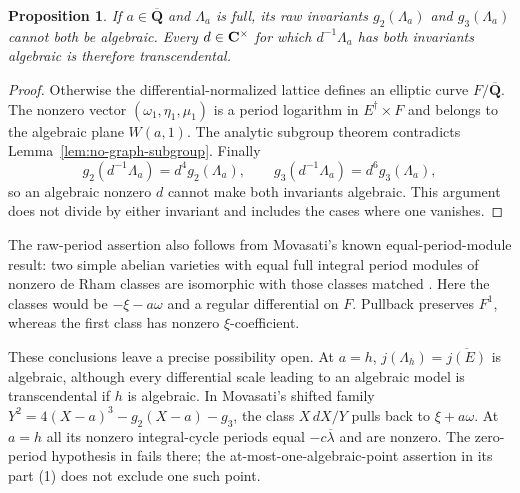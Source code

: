 \documentclass[11pt]{article}
\newtheorem{proposition}[theorem]{Proposition}
\theoremstyle{definition}\newtheorem{definition}[theorem]{Definition}
\theoremstyle{remark}\newtheorem{remark}[theorem]{Remark}
\newcommand{\Qb}{\overline{\mathbf Q}}\newcommand{\Fp}{\mathbf F_p}
\begin{document}
\begin{proposition}\label{prop:raw-second-kind}
If $a\in\Qb$ and $\Lambda_a$ is full, its raw invariants $g_2(\Lambda_a)$ and $g_3(\Lambda_a)$ cannot both be algebraic. Every $d\in\mathbf C^\times$ for which $d^{-1}\Lambda_a$ has both invariants algebraic is therefore transcendental.
\end{proposition}
\begin{proof}
Otherwise the differential-normalized lattice defines an elliptic curve $F/\Qb$. The nonzero vector
$(\omega_1,\eta_1,\mu_1)$ is a period logarithm in $E^\dagger\times F$ and belongs to the algebraic plane $W(a,1)$. The analytic subgroup theorem contradicts Lemma~\ref{lem:no-graph-subgroup}. Finally
\[
 g_2(d^{-1}\Lambda_a)=d^4g_2(\Lambda_a),\qquad
 g_3(d^{-1}\Lambda_a)=d^6g_3(\Lambda_a),
\]
so an algebraic nonzero $d$ cannot make both invariants algebraic. This argument does not divide by either invariant and includes the cases where one vanishes.
\end{proof}

The raw-period assertion also follows from Movasati's known equal-period-module result: two simple abelian varieties with equal full integral period modules of nonzero de Rham classes are isomorphic with those classes matched \cite[Corollary 2, p.~14]{Movasati}. Here the classes would be $-\xi-a\omega$ and a regular differential on $F$. Pullback preserves $F^1$, whereas the first class has nonzero $\xi$-coefficient.

These conclusions leave a precise possibility open. At $a=h$, $j(\Lambda_h)=\overline{j(E)}$ is algebraic, although every differential scale leading to an algebraic model is transcendental if $h$ is algebraic. In Movasati's shifted family
$Y^2=4(X-a)^3-g_2(X-a)-g_3$, the class $X\,dX/Y$ pulls back to $\xi+a\omega$. At $a=h$ all its nonzero integral-cycle periods equal $-c\overline\lambda$ and are nonzero. The zero-period hypothesis in \cite[Theorem 2(2), p.~3]{Movasati} fails there; the at-most-one-algebraic-point assertion in its part (1) does not exclude one such point.
\end{document}
